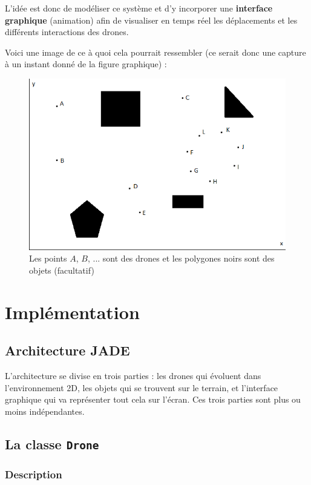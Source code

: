 \documentclass[11pt]{report}
\begin{document}
L'idée est donc de modéliser ce système et d'y incorporer une \textbf{interface graphique} (animation) afin de visualiser en temps réel les déplacements et les différents interactions des drones.

Voici une image de ce à quoi cela pourrait ressembler (ce serait donc une capture à un instant donné de la figure graphique) : 

\begin{figure}[h]
\centering
\includegraphics{img/drones-graphique.png}
\caption{Les points $A$, $B$, ... sont des drones et les polygones noirs sont des objets (facultatif)}
\end{figure}

\clearpage
\section{\textbf{Implémentation}}
\subsection{Architecture JADE}

L'architecture se divise en trois parties : les drones qui évoluent dans l'environnement 2D, les objets qui se trouvent sur le terrain, et l'interface graphique qui va représenter tout cela sur l'écran. Ces trois parties sont plus ou moins indépendantes.

\subsection{La classe \protect\Verb+Drone+}
\subsubsection{Description}
\end{document}
